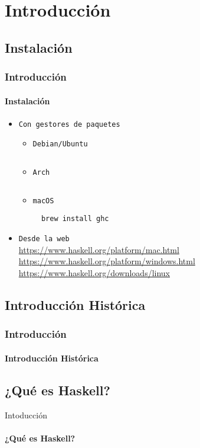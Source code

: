 \section{Introducción}
\subsection{Instalación}
\begin{frame}[fragile]
  \frametitle{Introducción}
  \framesubtitle{Instalación}
  \begin{itemize}
  \item\texttt{Con gestores de paquetes}
    \begin{itemize}
    \item\texttt{Debian/Ubuntu}
      {\color{white}
        \inputminted[bgcolor=bg]{text}{code/instalacion01.txt}
      }
    \item\texttt{Arch}
      {\color{white}
        \inputminted[bgcolor=bg]{text}{code/instalacion02.txt}
      }
    \item\texttt{macOS}
      {\color{white}
        \begin{verbatim}
  brew install ghc
        \end{verbatim}
      }
    \end{itemize}
  \item\texttt{Desde la web}\\
    \url{https://www.haskell.org/platform/mac.html}\\
    \url{https://www.haskell.org/platform/windows.html}\\
    \url{https://www.haskell.org/downloads/linux}
  \end{itemize}
\end{frame}

\subsection{Introducción Histórica}
\begin{frame}[fragile]          %
  \frametitle{Introducción}
  \framesubtitle{Introducción Histórica}
\end{frame}

\subsection{¿Qué es Haskell?}
\begin{frame}{Intoducción}      %
  \framesubtitle{¿Qué es Haskell?}
\end{frame}
